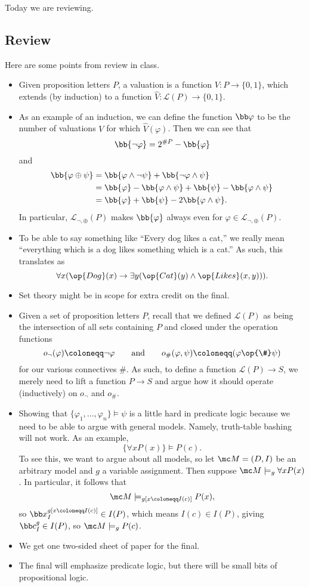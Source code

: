 \documentclass[../notes.tex]{subfiles}
\begin{document}

Today we are reviewing.

\subsection{Review}
Here are some points from review in class.
\begin{itemize}
	\item Given proposition letters $P$, a valuation is a function $V\colon P\to\{0,1\}$, which extends (by induction) to a function $\hat V\colon\mathcal L(P)\to\{0,1\}$.
	\item As an example of an induction, we can define the function $\bb\varphi$ to be the number of valuations $V$ for which $\hat V(\varphi)$. Then we can see that
	\[\bb{\lnot\varphi}=2^{\#P}-\bb{\varphi}\]
	and
	\begin{align*}
		\bb{\varphi\oplus\psi} &= \bb{\varphi\land\lnot\psi}+\bb{\lnot\varphi\land\psi} \\
		&= \bb{\varphi}-\bb{\varphi\land\psi}+\bb{\psi}-\bb{\varphi\land\psi} \\
		&= \bb{\varphi}+\bb{\psi}-2\bb{\varphi\land\psi}.
	\end{align*}
	In particular, $\mathcal L_{\lnot,\oplus}(P)$ makes $\bb{\varphi}$ always even for $\varphi\in\mathcal L_{\lnot,\oplus}(P)$.
	\item To be able to say something like ``Every dog likes a cat,'' we really mean ``everything which is a dog likes something which is a cat.'' As such, this translates as
	\[\forall x(\op{Dog}(x)\to\exists y(\op{Cat}(y)\land\op{Likes}(x,y))).\]
	\item Set theory might be in scope for extra credit on the final.
	\item Given a set of proposition letters $P$, recall that we defined $\mathcal L(P)$ as being the intersection of all sets containing $P$ and closed under the operation functions
	\[o_\lnot(\varphi)\coloneqq\lnot\varphi\qquad\text{and}\qquad o_\#(\varphi,\psi)\coloneqq(\varphi\op{\#}\psi)\]
	for our various connectives $\#$. As such, to define a function $\mathcal L(P)\to S$, we merely need to lift a function $P\to S$ and argue how it should operate (inductively) on $o_\lnot$ and $o_\#$.
	\item Showing that $\{\varphi_1,\ldots,\varphi_n\}\models\psi$ is a little hard in predicate logic because we need to be able to argue with general models. Namely, truth-table bashing will not work. As an example,
	\[\{\forall xP(x)\}\models P(c).\]
	To see this, we want to argue about all models, so let $\mc M=(D,I)$ be an arbitrary model and $g$ a variable assignment. Then suppose $\mc M\models_g\forall xP(x)$. In particular, it follows that
	\[\mc M\models_{g[x\coloneqq I(c)]}P(x),\]
	so $\bb x^{g[x\coloneqq I(c)]}_I\in I(P)$, which means $I(c)\in I(P)$, giving $\bb c^g_I\in I(P)$, so $\mc M\models_gP(c)$.
	\item We get one two-sided sheet of paper for the final.
	\item The final will emphasize predicate logic, but there will be small bits of propositional logic.
\end{itemize}
\end{document}
